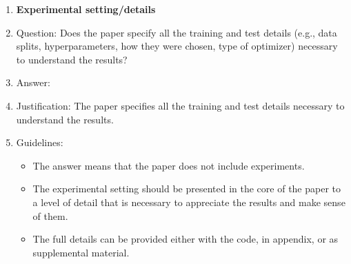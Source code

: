 \documentclass{article}
\begin{document}
\begin{enumerate}
\item {\bf Experimental setting/details}
    \item[] Question: Does the paper specify all the training and test details (e.g., data splits, hyperparameters, how they were chosen, type of optimizer) necessary to understand the results?
    \item[] Answer: \answerYes{} %
    \item[] Justification: The paper specifies all the training and test details necessary to understand the results.
    \item[] Guidelines:
    \begin{itemize}
        \item The answer \answerNA{} means that the paper does not include experiments.
        \item The experimental setting should be presented in the core of the paper to a level of detail that is necessary to appreciate the results and make sense of them.
        \item The full details can be provided either with the code, in appendix, or as supplemental material.
    \end{itemize}


\end{enumerate}
\end{document}
